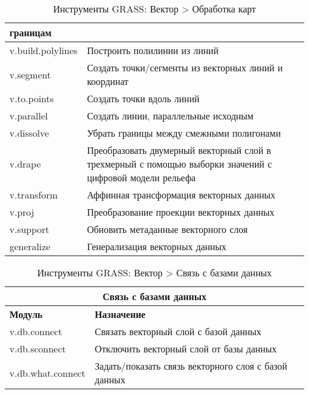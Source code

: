 {\begin{table}[H]
\begin{tabular}{|p{3cm}|p{11cm}|}
  границам \\
  \hline v.build.polylines & Построить полилинии из линий \\
  \hline v.segment & Создать точки/сегменты из векторных линий и
  координат \\
  \hline v.to.points & Создать точки вдоль линий \\
  \hline v.parallel & Создать линии, параллельные исходным \\
  \hline v.dissolve & Убрать границы между смежными полигонами \\
  \hline v.drape & Преобразовать двумерный векторный слой в трехмерный
  с помощью выборки значений с цифровой модели рельефа \\
  \hline v.transform & Аффинная трансформация векторных данных \\
  \hline v.proj & Преобразование проекции векторных данных \\
  \hline v.support & Обновить метаданные векторного слоя \\
  \hline generalize & Генерализация векторных данных \\
\hline
\end{tabular}
\caption{Инструменты GRASS: Вектор > Обработка карт}
\end{table}}

{\renewcommand{\arraystretch}{0.7}
\begin{table}[H]
\centering
 \begin{tabular}{|p{4cm}|p{10cm}|}
  \hline \multicolumn{2}{|c|}{\textbf{Связь с базами данных}} \\
  \hline \textbf{Модуль} & \textbf{Назначение} \\
  \hline v.db.connect & Связать векторный слой с базой данных \\
  \hline v.db.sconnect & Отключить векторный слой от базы данных \\
  \hline v.db.what.connect & Задать/показать связь векторного слоя с
  базой данных \\
\hline
\end{tabular}
\caption{Инструменты GRASS: Вектор > Связь с базами данных}
\end{table}}

